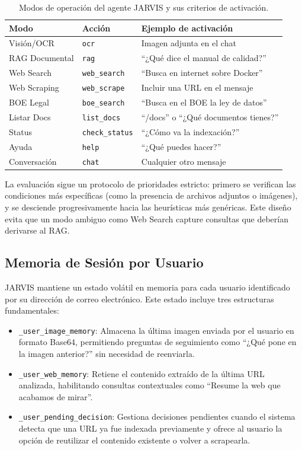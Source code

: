 \begin{table}[H]
\centering
\caption{Modos de operación del agente JARVIS y sus criterios de activación.}
\label{tab:jarvis-modos}
\begin{tabular}{lll}
\toprule
\textbf{Modo} & \textbf{Acción} & \textbf{Ejemplo de activación} \\
\midrule
Visión/OCR     & \texttt{ocr}          & Imagen adjunta en el chat \\
RAG Documental & \texttt{rag}          & ``¿Qué dice el manual de calidad?'' \\
Web Search     & \texttt{web\_search}  & ``Busca en internet sobre Docker'' \\
Web Scraping   & \texttt{web\_scrape}  & Incluir una URL en el mensaje \\
BOE Legal      & \texttt{boe\_search}  & ``Busca en el BOE la ley de datos'' \\
Listar Docs    & \texttt{list\_docs}   & ``/docs'' o ``¿Qué documentos tienes?'' \\
Status         & \texttt{check\_status}& ``¿Cómo va la indexación?'' \\
Ayuda          & \texttt{help}         & ``¿Qué puedes hacer?'' \\
Conversación   & \texttt{chat}         & Cualquier otro mensaje \\
\bottomrule
\end{tabular}
\end{table}

La evaluación sigue un protocolo de prioridades estricto: primero se verifican las condiciones más específicas (como la presencia de archivos adjuntos o imágenes), y se desciende progresivamente hacia las heurísticas más genéricas. Este diseño evita que un modo ambiguo como Web Search capture consultas que deberían derivarse al RAG.

\subsection{Memoria de Sesión por Usuario}
JARVIS mantiene un estado volátil en memoria para cada usuario identificado por su dirección de correo electrónico. Este estado incluye tres estructuras fundamentales:

\begin{itemize}
    \item \texttt{\_user\_image\_memory}: Almacena la última imagen enviada por el usuario en formato Base64, permitiendo preguntas de seguimiento como ``¿Qué pone en la imagen anterior?'' sin necesidad de reenviarla.
    \item \texttt{\_user\_web\_memory}: Retiene el contenido extraído de la última URL analizada, habilitando consultas contextuales como ``Resume la web que acabamos de mirar''.
    \item \texttt{\_user\_pending\_decision}: Gestiona decisiones pendientes cuando el sistema detecta que una URL ya fue indexada previamente y ofrece al usuario la opción de reutilizar el contenido existente o volver a scrapearla.
\end{itemize}

